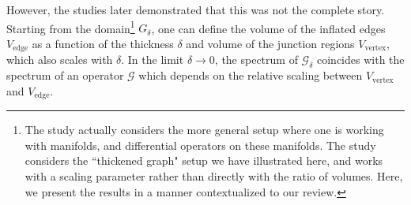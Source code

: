 However, the studies \cite{kuchment2003asymptotics, exner2005convergence} later demonstrated that this was not the complete story.
Starting from the domain\footnote{The study \cite{exner2005convergence} actually considers the more general setup where one is working with manifolds, and differential operators on these manifolds. The study \cite{kuchment2003asymptotics} considers the ``thickened graph" setup we have illustrated here, and works with a scaling parameter rather than directly with the ratio of volumes. Here, we present the results in a manner contextualized to our review.} $G_{\delta}$, one can define the volume of the inflated edges $V_{\mathrm{edge}}$ as a function of the thickness $\delta$ and volume of the junction regions $V_{\mathrm{vertex}}$, which also scales with $\delta$.
In the limit $\delta\rightarrow0$, the spectrum of $\mathcal{G}_{\delta}$ coincides with the spectrum of an operator $\mathcal{G}$ which depends on the relative scaling between $V_{\mathrm{vertex}}$ and $V_{\mathrm{edge}}$.
